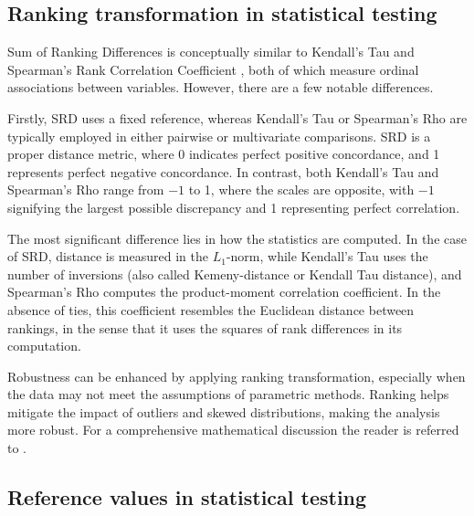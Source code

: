 \subsection{Ranking transformation in statistical testing}

Sum of Ranking Differences is conceptually similar to Kendall’s Tau \citep{Kendall_1938} and Spearman’s Rank Correlation Coefficient \citep{Spearman1904}, both of which measure ordinal associations between variables. However, there are a few notable differences.

Firstly, SRD uses a fixed reference, whereas Kendall's Tau or Spearman's Rho are typically employed in either pairwise or multivariate comparisons. SRD is a proper distance metric, where 0 indicates perfect positive concordance, and 1 represents perfect negative concordance. In contrast, both Kendall's Tau and Spearman's Rho range from $-1$ to 1, where the scales are opposite, with $-1$ signifying the largest possible discrepancy and 1 representing perfect correlation.

The most significant difference lies in how the statistics are computed. In the case of SRD, distance is measured in the $L_1$-norm, while Kendall's Tau uses the number of inversions (also called Kemeny-distance or Kendall Tau distance), and Spearman's Rho computes the product-moment correlation coefficient. In the absence of ties, this coefficient resembles the Euclidean distance between rankings, in the sense that it uses the squares of rank differences in its computation.

Robustness can be enhanced by applying ranking transformation, especially when the data may not meet the assumptions of parametric methods. Ranking helps mitigate the impact of outliers and skewed distributions, making the analysis more robust. For a comprehensive mathematical discussion the reader is referred to \citep{kendall1970rank}. %

\subsection{Reference values in statistical testing}


